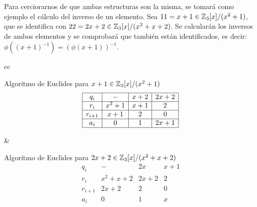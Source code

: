 \begin{Revision}
\begin{ejs}
        Para cerciorarnos de que ambas estructuras son la misma, se tomará como ejemplo el cálculo del inverso de un elemento. Sea $11 = x + 1 \in \mathbb{Z}_3[x]/(x^2 + 1)$, que se identifica con  $22 = 2x + 2 \in \mathbb{Z}_3[x]/(x^2 + x + 2)$. Se calcularán los inversos de ambos elementos y se comprobará que también están identificados, es decir: $\phi( (x + 1)^{-1}) = (\phi(x + 1))^{-1}$.

        
        \begin{center}\vspace{-0.3em}
            \begin{tabular}{cc}
                \begin{minipage}[t]{0.42\textwidth}
                    \centering
                    Algoritmo de Euclides para $x +1 \in \mathbb{Z}_3[x]/(x^2 + 1)$
                   \[
                        \begin{array}{|c|c|c|c|}
                        \hline
                        q_i     &  -          & x + 2     & 2x + 2\\
                        \hline
                        r_i    &  x^2 + 1 & x +1& 2  \\
                        \hline
                        r_{i+1} &  x +1  & 2           &  0     \\
                        \hline
                        a_i     &0            &  1          &  2x + 1       \\
                        \hline
                    \end{array}
                    \]
                \end{minipage}
                &
                \begin{minipage}[t]{0.45\textwidth}
                    \centering
                    Algoritmo de Euclides para $2x + 2 \in \mathbb{Z}_3[x]/(x^2 + x + 2)$
                    \[
                    \begin{array}{|c|c|c|c|}
                        \hline
                        q_i     &  -          & 2x      & x + 1\\
                        \hline
                        r_i    &  x^2 + x + 2 & 2x + 2& 2\\
                        \hline
                        r_{i+1} &  2x + 2      & 2           &  0     \\
                        \hline
                        a_i     &0            &  1          &  x     \\

\end{array}\]
\end{minipage}
\end{tabular}
\end{center}
\end{ejs}
\end{Revision}
